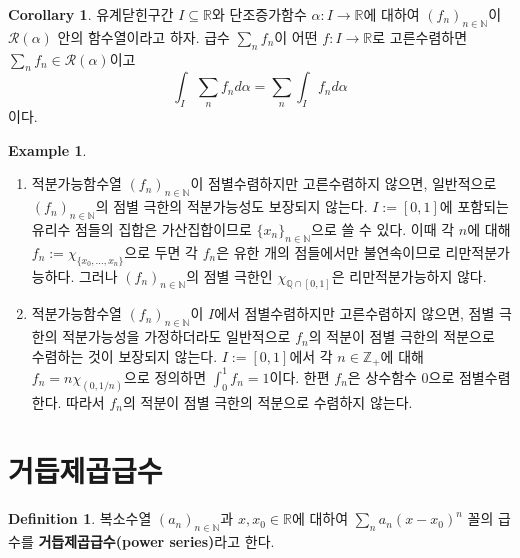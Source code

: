 \documentclass[11pt]{book}
\numberwithin{equation}{chapter}
\def\NN{\mathbb{N}}
\def\ZZ{\mathbb{Z}}
\def\QQ{\mathbb{Q}}
\def\RR{\mathbb{R}}
\def\calR{\mathcal{R}}
\theoremstyle{definition}
\newtheorem{cor}[thm]{Corollary}
\newtheorem{defn}[thm]{Definition}
\newtheorem*{ex}{Example}
\newenvironment{enum}
	{\begin{enumerate}[label=(\alph*), leftmargin=2\parindent]}
	{\end{enumerate}}
\begin{document}
\begin{cor}
    유계닫힌구간 \(I \subseteq \RR\)와 단조증가함수 \(\alpha : I  \to \RR\)에 대하여 \((f_n)_{n \in \NN}\)이 \(\calR(\alpha)\) 안의 함수열이라고 하자. 급수 \(\sum_n f_n\)이 어떤 \(f : I \to \RR\)로 고른수렴하면 \(\sum_n f_n \in \calR(\alpha)\)이고
    \[
    \int_I \sum_n f_n d\alpha = \sum_n \int_I f_n d\alpha
    \]
    이다.
\end{cor}

\begin{ex}
    \quad

    \begin{enum}
        \item 적분가능함수열 \((f_n)_{n \in \NN}\)이 점별수렴하지만 고른수렴하지 않으면, 일반적으로 \mbox{\((f_n)_{n \in \NN}\)}의 점별 극한의 적분가능성도 보장되지 않는다. \(I := [0, 1]\)에 포함되는 유리수 점들의 집합은 가산집합이므로 \(\{x_n\}_{n \in \NN}\)으로 쓸 수 있다. 이때 각 \(n\)에 대해 \(f_n := \chi_{\{x_0, \ldots, x_n\}}\)으로 두면 각 \(f_n\)은 유한 개의 점들에서만 불연속이므로 리만적분가능하다. 그러나 \((f_n)_{n \in \NN}\)의 점별 극한인 \(\chi_{\QQ \cap [0, 1]}\)은 리만적분가능하지 않다.
        \item 적분가능함수열 \((f_n)_{n \in \NN}\)이 \(I\)에서 점별수렴하지만 고른수렴하지 않으면, 점별 극한의 적분가능성을 가정하더라도 일반적으로 \(f_n\)의 적분이 점별 극한의 적분으로 수렴하는 것이 보장되지 않는다. \(I := [0, 1]\)에서 각 \(n \in \ZZ_+\)에 대해 \(f_n = n\chi_{(0, 1/n)}\)으로 정의하면 \(\int_0^1 f_n = 1\)이다. 한편 \(f_n\)은 상수함수 0으로 점별수렴한다. 따라서 \(f_n\)의 적분이 점별 극한의 적분으로 수렴하지 않는다.
    \end{enum}
\end{ex}

\section{거듭제곱급수} \label{sec12.3}

\begin{defn}
    복소수열 \((a_n)_{n \in \NN}\)과 \(x, x_0 \in \RR\)에 대하여 \(\sum_n a_n (x - x_0)^n\) 꼴의 급수를 \textbf{거듭제곱급수(power series)}라고 한다.
\end{defn}
\end{document}
